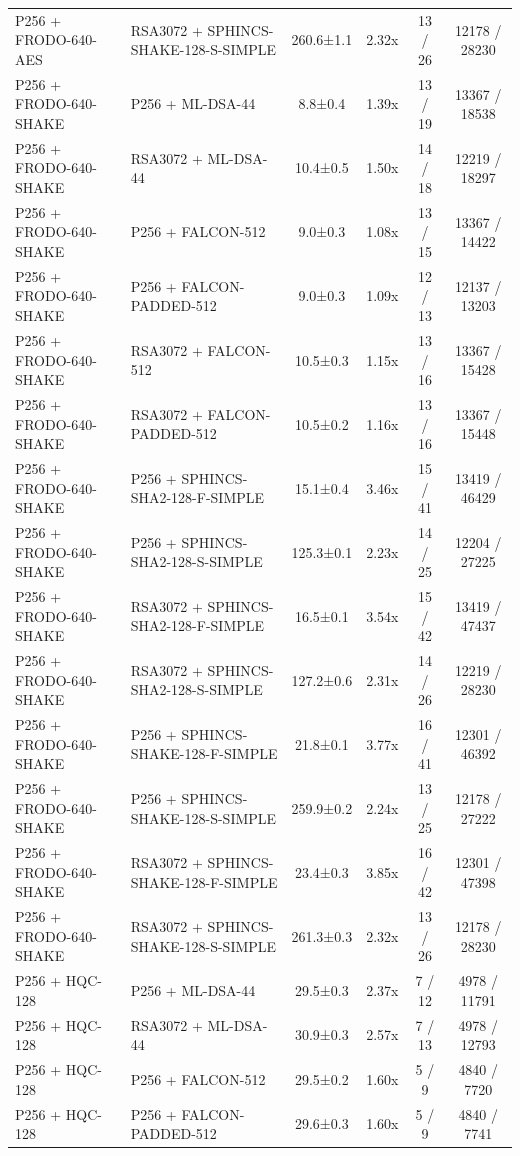 \documentclass[10pt]{article}
\begin{document}
\begin{tabular}{@{}l l c c c c@{}}
P256 + FRODO-640-AES & RSA3072 + SPHINCS-SHAKE-128-S-SIMPLE & 260.6±1.1 & 2.32x & 13 / 26 & 12178 / 28230 \\
P256 + FRODO-640-SHAKE & P256 + ML-DSA-44 & 8.8±0.4 & 1.39x & 13 / 19 & 13367 / 18538 \\
P256 + FRODO-640-SHAKE & RSA3072 + ML-DSA-44 & 10.4±0.5 & 1.50x & 14 / 18 & 12219 / 18297 \\
P256 + FRODO-640-SHAKE & P256 + FALCON-512 & 9.0±0.3 & 1.08x & 13 / 15 & 13367 / 14422 \\
P256 + FRODO-640-SHAKE & P256 + FALCON-PADDED-512 & 9.0±0.3 & 1.09x & 12 / 13 & 12137 / 13203 \\
P256 + FRODO-640-SHAKE & RSA3072 + FALCON-512 & 10.5±0.3 & 1.15x & 13 / 16 & 13367 / 15428 \\
P256 + FRODO-640-SHAKE & RSA3072 + FALCON-PADDED-512 & 10.5±0.2 & 1.16x & 13 / 16 & 13367 / 15448 \\
P256 + FRODO-640-SHAKE & P256 + SPHINCS-SHA2-128-F-SIMPLE & 15.1±0.4 & 3.46x & 15 / 41 & 13419 / 46429 \\
P256 + FRODO-640-SHAKE & P256 + SPHINCS-SHA2-128-S-SIMPLE & 125.3±0.1 & 2.23x & 14 / 25 & 12204 / 27225 \\
P256 + FRODO-640-SHAKE & RSA3072 + SPHINCS-SHA2-128-F-SIMPLE & 16.5±0.1 & 3.54x & 15 / 42 & 13419 / 47437 \\
P256 + FRODO-640-SHAKE & RSA3072 + SPHINCS-SHA2-128-S-SIMPLE & 127.2±0.6 & 2.31x & 14 / 26 & 12219 / 28230 \\
P256 + FRODO-640-SHAKE & P256 + SPHINCS-SHAKE-128-F-SIMPLE & 21.8±0.1 & 3.77x & 16 / 41 & 12301 / 46392 \\
P256 + FRODO-640-SHAKE & P256 + SPHINCS-SHAKE-128-S-SIMPLE & 259.9±0.2 & 2.24x & 13 / 25 & 12178 / 27222 \\
P256 + FRODO-640-SHAKE & RSA3072 + SPHINCS-SHAKE-128-F-SIMPLE & 23.4±0.3 & 3.85x & 16 / 42 & 12301 / 47398 \\
P256 + FRODO-640-SHAKE & RSA3072 + SPHINCS-SHAKE-128-S-SIMPLE & 261.3±0.3 & 2.32x & 13 / 26 & 12178 / 28230 \\
P256 + HQC-128 & P256 + ML-DSA-44 & 29.5±0.3 & 2.37x & 7 / 12 & 4978 / 11791 \\
P256 + HQC-128 & RSA3072 + ML-DSA-44 & 30.9±0.3 & 2.57x & 7 / 13 & 4978 / 12793 \\
P256 + HQC-128 & P256 + FALCON-512 & 29.5±0.2 & 1.60x & 5 / 9 & 4840 / 7720 \\
P256 + HQC-128 & P256 + FALCON-PADDED-512 & 29.6±0.3 & 1.60x & 5 / 9 & 4840 / 7741 \\

\end{tabular}
\end{document}
